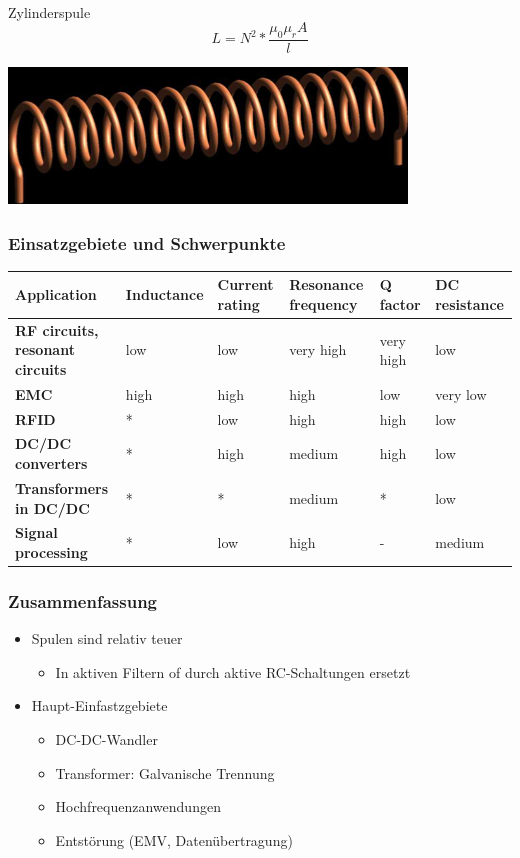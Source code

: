 \\
\begin{minipage}{9cm}
Zylinderspule\\
\begin{equation}
L=N^2*\frac{\mu_{0}\mu_{r}A}{l}
\end{equation}
\end{minipage}
\begin{minipage}{9cm}
\includegraphics[scale=0.4]{pictures/zylinderspule}
\end{minipage}

\subsubsection{Einsatzgebiete und Schwerpunkte}
\begin{longtable}{|p{3.5cm}|l|l|l|l|l|}
\hline
\textbf{Application}&Inductance&Current rating&Resonance frequency&Q factor&DC
resistance\\
\hline
\textbf{RF circuits, resonant circuits}&low&low&very high&very high&low\\
\hline
\textbf{EMC}&high&high&high&low&very low\\
\hline
\textbf{RFID}&*&low&high&high&low\\
\hline
\textbf{DC/DC converters}&*&high&medium&high&low\\
\hline
\textbf{Transformers in DC/DC}&*&*&medium&*&low\\
\hline
\textbf{Signal processing}&*&low&high&-&medium\\
\hline
\end{longtable}

\subsubsection{Zusammenfassung}
\begin{itemize}
  \item Spulen sind relativ teuer
  \begin{itemize}
    \item In aktiven Filtern of durch aktive RC-Schaltungen ersetzt
  \end{itemize}
  \item Haupt-Einfastzgebiete
  \begin{itemize}
    \item DC-DC-Wandler
    \item Transformer: Galvanische Trennung
    \item Hochfrequenzanwendungen
    \item Entstörung (EMV, Datenübertragung)
  \end{itemize}
\end{itemize}

